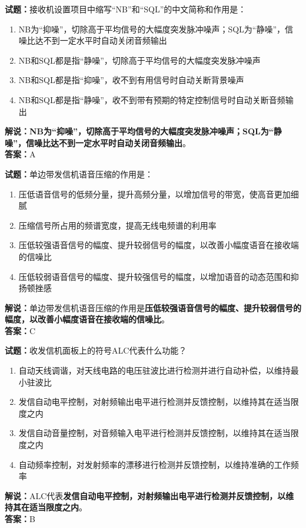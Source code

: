 \documentclass{ctexbook}
\begin{document}
\bigskip


\noindent\textbf{试题：}接收机设置项目中缩写“NB”和“SQL”的中文简称和作用是：
\begin{enumerate}[leftmargin=3em]
\item NB为“抑噪”，切除高于平均信号的大幅度突发脉冲噪声；SQL为“静噪”，信噪比达不到一定水平时自动关闭音频输出
\item NB和SQL都是指“静噪”，切除高于平均信号的大幅度突发脉冲噪声
\item NB和SQL都是指“抑噪”，收不到有用信号时自动关断背景噪声
\item NB和SQL都是指“静噪”，收不到带有预期的特定控制信号时自动关断音频输出
\end{enumerate}
\noindent\textbf{解说：}\textbf{NB为“抑噪”，切除高于平均信号的大幅度突发脉冲噪声；SQL为“静噪”，信噪比达不到一定水平时自动关闭音频输出}。\\\noindent\textbf{答案：}A


\bigskip


\noindent\textbf{试题：}单边带发信机语音压缩的作用是：
\begin{enumerate}[leftmargin=3em]
\item 压低语音信号的低频分量，提升高频分量，以增加信号的带宽，使高音更加细腻
\item 压缩信号所占用的频谱宽度，提高无线电频谱的利用率
\item 压低较强语音信号的幅度、提升较弱信号的幅度，以改善小幅度语音在接收端的信噪比
\item 压低较弱语音信号的幅度、提升较强信号的幅度，以增加语音的动态范围和抑扬顿挫感
\end{enumerate}
\noindent\textbf{解说：}单边带发信机语音压缩的作用是\textbf{压低较强语音信号的幅度、提升较弱信号的幅度，以改善小幅度语音在接收端的信噪比}。\\\noindent\textbf{答案：}C




\bigskip


\noindent\textbf{试题：}收发信机面板上的符号ALC代表什么功能？
\begin{enumerate}[leftmargin=3em]
\item 自动天线调谐，对天线电路的电压驻波比进行检测并进行自动补偿，以维持最小驻波比
\item 发信自动电平控制，对射频输出电平进行检测并反馈控制，以维持其在适当限度之内
\item 发信自动音量控制，对音频输入电平进行检测并反馈控制，以维持其在适当限度之内
\item 自动频率控制，对发射频率的漂移进行检测并反馈控制，以维持准确的工作频率
\end{enumerate}
\noindent\textbf{解说：}ALC代表\textbf{发信自动电平控制，对射频输出电平进行检测并反馈控制，以维持其在适当限度之内}。\\\noindent\textbf{答案：}B
\end{document}
